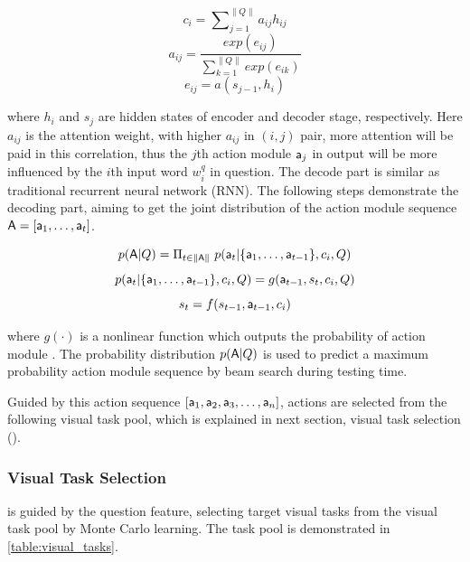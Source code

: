 \begin{small}
\begin{equation} 
    c_i= \sum\nolimits_{j=1}^{\|Q\|} a_{ij}h_{ij}
\end{equation}
\begin{equation} 
    a_{ij}= \frac{exp(e_{ij})}{\sum\nolimits_{k=1}^{\|Q\|} exp(e_{ik})}
\end{equation}
\begin{equation} 
    e_{ij}= a(s_{j-1},h_i)
\end{equation}
\end{small}

\noindent where $h_i$ and $s_j$ are hidden states of encoder and decoder stage, respectively. Here $a_{ij}$ is the attention weight, with higher $a_{ij}$ in $(i, j)$ pair, more attention will be paid in this correlation, thus the $j$th action module ${\mathsf{a}}_j$ in output will be more influenced by the $i$th input word $w_i^q$ in question. The decode part is similar as traditional recurrent neural network (RNN). The following steps demonstrate the decoding part, aiming to get the joint distribution of the action module sequence ${\mathsf{A}} = [{\mathsf{a}}_1,\dots,{\mathsf{a}}_t]$.

\begin{small}
\begin{equation} 
    p({\mathsf{A}}|Q) = \Pi_{t\in\|{\mathsf{A}}\|}~p({\mathsf{a}}_t|\{{\mathsf{a}}_1,\dots,{\mathsf{a}}_{t-1}\},c_i,Q)
\end{equation}
\begin{equation} 
    p({\mathsf{a}}_t|\{{\mathsf{a}}_1,\dots,{\mathsf{a}}_{t-1}\},c_i,Q)= g({\mathsf{a}}_{t-1},s_t,c_i,Q)
\end{equation}
\begin{equation} 
    s_t = f(s_{t-1},{\mathsf{a}}_{t-1},c_i)
\end{equation}
\end{small}
\noindent where $g(\cdot)$ is a nonlinear function which outputs the probability of action module . The probability distribution $p({\mathsf{A}}|Q)$ is used to predict a maximum probability action module sequence by beam search during testing time.

Guided by this action sequence $[{\mathsf{a}}_1,{\mathsf{a}}_2,{\mathsf{a}}_3,\dots,{\mathsf{a}}_n]$, actions are selected from the following visual task pool, which is explained in next section, visual task selection ().


\subsubsection{Visual Task Selection}
\label{sec-VTS}
\hspace{\parindent} is guided by the question feature, selecting target visual tasks from the visual task pool by Monte Carlo learning. The task pool is demonstrated in \cref{table:visual_tasks}.


